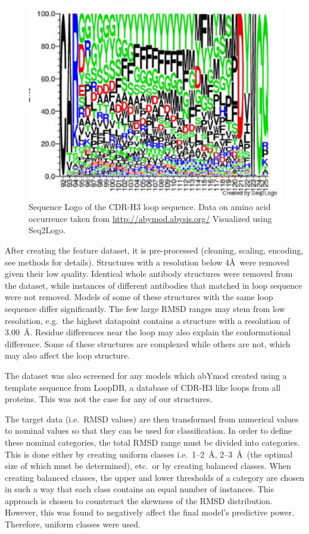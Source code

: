 \documentclass[12pt]{article}
\begin{document}
\begin{figure}
  \centering
  \includegraphics[width=\linewidth]{logo.eps}
  \caption {Sequence Logo of the CDR-H3 loop sequence. Data on amino
    acid occurrence taken from \protect\url{http://abymod.abysis.org/} Visualized
    using Seq2Logo.}
  \label{fig:logo}
\end{figure}

After creating the feature dataset, it is pre-processed (cleaning,
scaling, encoding, see methods for details). Structures with a
resolution below 4\AA\ were removed given their low quality. Identical
whole antibody structures were removed from the dataset, while
instances of different antibodies that matched in loop sequence were
not removed. Models of some of these structures with the same loop
sequence differ significantly. The few large RMSD ranges may stem from
low resolution, e.g.\ the highest datapoint contains a structure with a
resolution of 3.00~\AA.  Residue differences near the loop may also
explain the conformational difference. Some of these structures are
complexed while others are not, which may also affect the loop
structure.


The dataset was also screened for any models which abYmod created
using a template sequence from LoopDB, a database of CDR-H3 like loops
from all proteins. This was not the case for any of our structures.

The target data (i.e.\ RMSD values) are then transformed from numerical
values to nominal values so that they can be used for
classification. In order to define these nominal categories, the total
RMSD range must be divided into categories. This is done either by
creating uniform classes i.e.\ 1--2~\AA, 2--3~\AA\ (the optimal size of which
must be determined), etc.\ or by creating balanced classes. When
creating balanced classes, the upper and lower thresholds of a
category are chosen in such a way that each class contains an equal
number of instances. This approach is chosen to counteract the
skewness of the RMSD distribution. However, this was found to
negatively affect the final model's predictive power. Therefore,
uniform classes were used.
\end{document}
